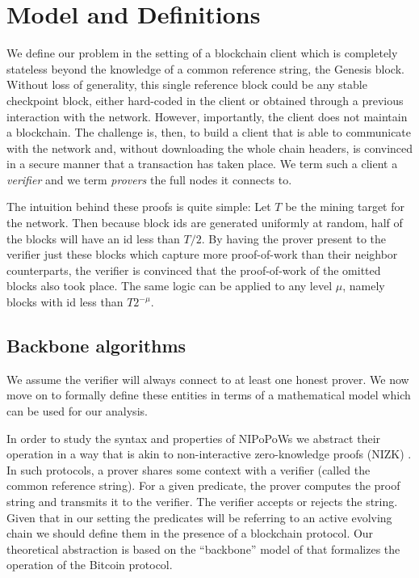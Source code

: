 \section{Model and Definitions}
\label{sec.model}

We define our problem in the setting of a blockchain client which is completely
stateless beyond the knowledge of a common reference string, the Genesis block.
Without loss of generality, this single reference block could be any stable
checkpoint block, either hard-coded in the client or obtained through a previous
interaction with the network. However, importantly, the client does not maintain
a blockchain. The challenge is, then, to build a client that is able to
communicate with the network and, without downloading the whole chain headers,
is convinced in a secure manner that a transaction has taken place. We term such
a client a \textit{verifier} and we term \textit{provers} the full nodes it
connects to.

The intuition behind these proofs is quite simple: Let $T$ be the mining target
for the network. Then because block ids are generated uniformly at random, half
of the blocks will have an id less than $T / 2$. By having the prover present to
the verifier just these blocks which capture more proof-of-work than their
neighbor counterparts, the verifier is convinced that the proof-of-work of the
omitted blocks also took place. The same logic can be applied to any level
$\mu$, namely blocks with id less than $T 2^{-\mu}$.

\subsection{Backbone algorithms}


We assume the verifier will always connect to at least one honest prover. We
now move on to formally define these entities in terms of a mathematical model
which can be used for our analysis.

In order to study the syntax and properties of NIPoPoWs
we abstract their operation in a way that is akin to non-interactive
zero-knowledge proofs (NIZK) \cite{BFM88}. In such protocols, a prover
shares some context with a verifier (called the common reference string).
For a given predicate, the prover computes the proof string and transmits it
to the verifier. The verifier accepts or rejects the string. Given that in our
setting the predicates will be referring to an active evolving chain
we should define them in the presence of a blockchain protocol.
Our theoretical abstraction is based on  the ``backbone'' model of
\cite{backbone} that formalizes the operation of the Bitcoin protocol.

